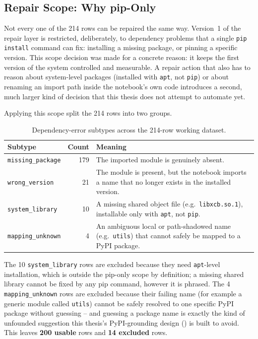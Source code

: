 \subsection{Repair Scope: Why pip-Only}
\label{sec:pd-scope}

Not every one of the 214 rows can be repaired the same way. Version~1 of the
repair layer is restricted, deliberately, to dependency problems that a
single \texttt{pip install} command can fix: installing a missing package,
or pinning a specific version. This scope decision was made for a concrete
reason: it keeps the first version of the system controlled and measurable.
A repair action that also has to reason about system-level packages
(installed with \texttt{apt}, not \texttt{pip}) or about renaming an import
path inside the notebook's own code introduces a second, much larger kind of
decision that this thesis does not attempt to automate yet.

Applying this scope split the 214 rows into two groups.

\begin{table}[h]
  \centering
  \begin{tabular}{|l|r|p{6.3cm}|}
    \hline
    \textbf{Subtype} & \textbf{Count} & \textbf{Meaning} \\
    \hline
    \texttt{missing\_package} & 179 & The imported module is genuinely absent. \\
    \hline
    \texttt{wrong\_version} & 21 & The module is present, but the notebook imports a name that no longer exists in the installed version. \\
    \hline
    \texttt{system\_library} & 10 & A missing shared object file (e.g.\ \texttt{libxcb.so.1}), installable only with \texttt{apt}, not \texttt{pip}. \\
    \hline
    \texttt{mapping\_unknown} & 4 & An ambiguous local or path-shadowed name (e.g.\ \texttt{utils}) that cannot safely be mapped to a PyPI package. \\
    \hline
  \end{tabular}
  \caption{Dependency-error subtypes across the 214-row working dataset.}
  \label{tab:pd-subtypes}
\end{table}

The 10 \texttt{system\_library} rows are excluded because they need
\texttt{apt}-level installation, which is outside the pip-only scope by
definition; a missing shared library cannot be fixed by any pip command,
however it is phrased. The 4 \texttt{mapping\_unknown} rows are excluded
because their failing name (for example a generic module called
\texttt{utils}) cannot be safely resolved to one specific PyPI package
without guessing -- and guessing a package name is exactly the kind of
unfounded suggestion this thesis's PyPI-grounding design
() is built to avoid. This leaves \textbf{200 usable}
rows and \textbf{14 excluded} rows.

